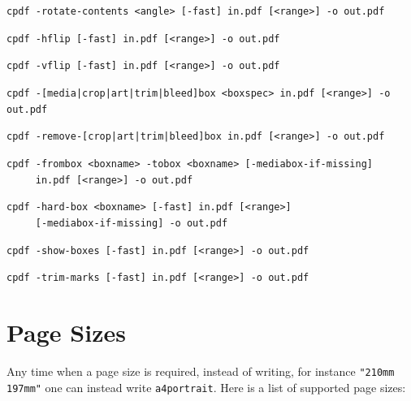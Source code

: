 \documentclass{book}
\begin{document}
\begin{framed}
  \vspace{1.5mm}
  \small\noindent\verb!cpdf -rotate-contents <angle> [-fast] in.pdf [<range>] -o out.pdf!


  \vspace{1.5mm}
  \small\noindent\verb!cpdf -hflip [-fast] in.pdf [<range>] -o out.pdf!

  \vspace{1.5mm}
  \small\noindent\verb!cpdf -vflip [-fast] in.pdf [<range>] -o out.pdf!

  \vspace{1.5mm}
  \small\noindent\verb!cpdf -[media|crop|art|trim|bleed]box <boxspec> in.pdf [<range>] -o out.pdf!

  \vspace{1.5mm}
  \small\noindent\verb!cpdf -remove-[crop|art|trim|bleed]box in.pdf [<range>] -o out.pdf!

  \vspace{1.5mm}
  \small\noindent\verb!cpdf -frombox <boxname> -tobox <boxname> [-mediabox-if-missing]! \\
  \noindent\verb!     in.pdf [<range>] -o out.pdf!

  \vspace{1.5mm}
  \small\noindent\verb!cpdf -hard-box <boxname> [-fast] in.pdf [<range>]!\\
  \small\noindent\verb!     [-mediabox-if-missing] -o out.pdf!

  \vspace{1.5mm}
  \small\noindent\verb!cpdf -show-boxes [-fast] in.pdf [<range>] -o out.pdf!

  \vspace{1.5mm}
  \small\noindent\verb!cpdf -trim-marks [-fast] in.pdf [<range>] -o out.pdf!

  \end{framed}

  \section{Page Sizes}
\label{papersizes}
  Any time when a page size is required, instead of writing, for instance \texttt{"210mm 197mm"} one can instead write \texttt{a4portrait}. Here is a list of supported page sizes:
\end{document}
